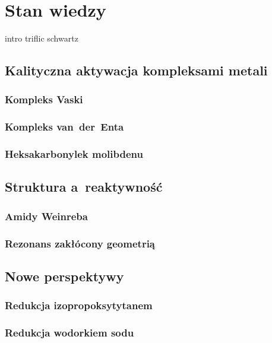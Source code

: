 \chapter{Stan wiedzy}\label{chapter:literature}

{intro}
{triflic}
{schwartz}

\section{Kalityczna aktywacja kompleksami metali}\label{literature:catalitic}
\subsection{Kompleks Vaski}\label{literature:catalitic:vasca}
\subsection{Kompleks van~der~Enta}\label{literature:catalitic:van-der-ent}
\subsection{Heksakarbonylek molibdenu}\label{literature:catalitic:molydenium}

\section{Struktura a~reaktywność}\label{literature:structure}
\subsection{Amidy Weinreba}\label{literature:structure:weinreb}
\subsection{Rezonans zakłócony geometrią}\label{literature:structure:geometry}

\section{Nowe perspektywy}\label{literature:perspectives}
\subsection{Redukcja izopropoksytytanem}\label{literature:perspectives:titanium}
\subsection{Redukcja wodorkiem sodu}\label{literature:perspectives:sodium-hydride}

